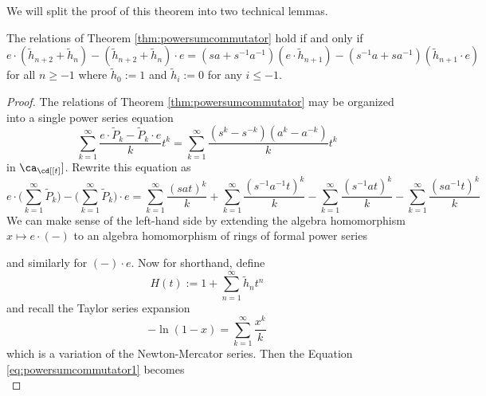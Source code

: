 We will split the proof of this theorem into two technical lemmas.

\begin{lemma} \label{lem:powersumcommutator1}
The relations of Theorem \ref{thm:powersumcommutator} hold if and only if 
\begin{equation} \label{eq:powersumcommutator1}
e \cdot (\tilde{h}_{n+2} + \tilde{h}_n) - (\tilde{h}_{n+2} + \tilde{h}_n) \cdot e = (sa + s^{-1}a^{-1}) (e \cdot \tilde{h}_{n+1}) - (s^{-1}a + sa^{-1}) (\tilde{h}_{n+1} \cdot e)
\end{equation}
for all $n \geq -1$ where $\tilde{h}_0 := 1$ and $\tilde{h}_{i} := 0$ for any $i \leq -1$. 
\end{lemma}
\begin{proof}
The relations of Theorem \ref{thm:powersumcommutator} may be organized into a single power series equation
\begin{equation} \label{eq:powersumcommutator1}
\sum_{k=1}^\infty \frac{e \cdot \tilde{P}_k - \tilde{P}_k \cdot e}{k} t^k = \sum_{k=1}^{\infty} \frac {(s^k - s^{-k}) (a^k - a^{-k})}{k} t^k
\end{equation}
in $\ca_\cd [[t]]$. Rewrite this equation as
\begin{equation} \label{eq:powersumcommutator2} 
e \cdot \Bigg( \sum_{k=1}^\infty \tilde{P}_k \Bigg) - \Bigg( \sum_{k=1}^\infty \tilde{P}_k \Bigg) \cdot e = \sum_{k=1}^{\infty} \frac {(sat)^k}{k} + \sum_{k=1}^{\infty} \frac {(s^{-1}a^{-1}t)^k}{k} - \sum_{k=1}^{\infty} \frac {(s^{-1}at)^k}{k} - \sum_{k=1}^{\infty} \frac {(sa^{-1}t)^k}{k}
\end{equation}
We can make sense of the left-hand side by extending the algebra homomorphism $x \mapsto e \cdot (-)$ to an algebra homomorphism of rings of formal power series
\begin{center}
\end{center}
and similarly for $(-) \cdot e$. Now for shorthand, define 
\[
H(t) := 1 + \sum_{n=1}^\infty \tilde{h}_n t^n
\]
and recall the Taylor series expansion
\[
-\ln(1-x) = \sum_{k=1}^\infty \frac{x^k}{k}
\]
which is a variation of the Newton-Mercator series. Then the Equation \eqref{eq:powersumcommutator1} becomes
\begin{equation} \label{eq:powersumcommutator3} 

\end{equation}
\end{proof}
